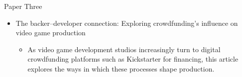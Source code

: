\documentclass{beamer}
\begin{document}
\begin{frame}{Paper Three}
	\begin{itemize}
		\item The backer–developer connection: Exploring crowdfunding's influence on video game production \pause
			\begin{itemize}
				\item As video game development studios increasingly turn to digital crowdfunding platforms such as Kickstarter for financing, this article explores the ways in which these processes shape production. \pause
			\end{itemize}
	\end{itemize}
\end{frame}
\end{document}
